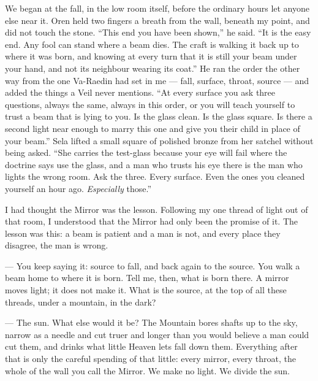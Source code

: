 \ornament

\noindent We began at the fall, in the low room itself, before the ordinary hours let anyone else near it. Oren held two fingers a breath from the wall, beneath my point, and did not touch the stone. ``This end you have been shown,'' he said. ``It is the easy end. Any fool can stand where a beam dies. The craft is walking it back up to where it was born, and knowing at every turn that it is still your beam under your hand, and not its neighbour wearing its coat.'' He ran the order the other way from the one Va-Raedin had set in me --- fall, surface, throat, source --- and added the things a Veil never mentions. ``At every surface you ask three questions, always the same, always in this order, or you will teach yourself to trust a beam that is lying to you. Is the glass clean. Is the glass square. Is there a second light near enough to marry this one and give you their child in place of your beam.'' Sela lifted a small square of polished bronze from her satchel without being asked. ``She carries the test-glass because your eye will fail where the doctrine says use the glass, and a man who trusts his eye there is the man who lights the wrong room. Ask the three. Every surface. Even the ones you cleaned yourself an hour ago. \textit{Especially} those.''\par

I had thought the Mirror was the lesson. Following my one thread of light out of that room, I understood that the Mirror had only been the promise of it. The lesson was this: a beam is patient and a man is not, and every place they disagree, the man is wrong.\par

\begin{room}

--- You keep saying it: source to fall, and back again to the source. You walk a beam home to where it is born. Tell me, then, what is born there. A mirror moves light; it does not make it. What is the source, at the top of all these threads, under a mountain, in the dark?

--- The sun. What else would it be? The Mountain bores shafts up to the sky, narrow as a needle and cut truer and longer than you would believe a man could cut them, and drinks what little Heaven lets fall down them. Everything after that is only the careful spending of that little: every mirror, every throat, the whole of the wall you call the Mirror. We make no light. We divide the sun.

\end{room}

